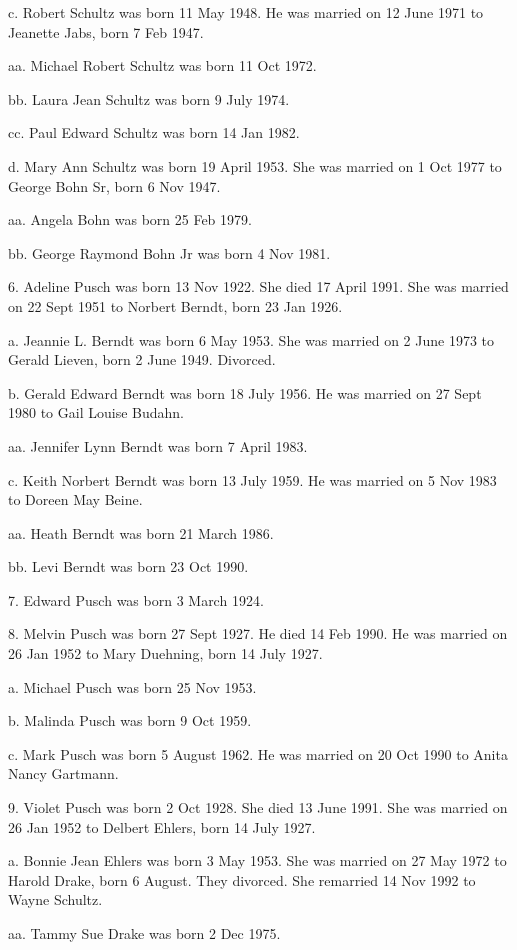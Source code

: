 \documentclass[a4paper]{article}
\begin{document}
c. Robert Schultz was born 11 May 1948.  He was married on 12 June 1971 to Jeanette Jabs, born 7 Feb 1947.  

aa. Michael Robert Schultz was born 11 Oct 1972.

bb. Laura Jean Schultz was born 9 July 1974.

cc. Paul Edward Schultz was born 14 Jan 1982.

d. Mary Ann Schultz was born 19 April 1953.  She was married on 1 Oct 1977 to George Bohn Sr, born 6 Nov 1947.

aa. Angela Bohn was born 25 Feb 1979.

bb. George Raymond Bohn Jr was born 4 Nov 1981.

6. Adeline Pusch was born 13 Nov 1922.  She died 17 April 1991.  She was married on 22 Sept 1951 to Norbert Berndt, born 23 Jan 1926.

a. Jeannie L. Berndt was born 6 May 1953.  She was married on 2 June 1973 to Gerald Lieven, born 2 June 1949.  Divorced.

b. Gerald Edward Berndt was born 18 July 1956.  He was married on 27 Sept 1980 to Gail Louise Budahn.

aa. Jennifer Lynn Berndt was born 7 April 1983.

c. Keith Norbert Berndt was born 13 July 1959.  He was married on 5 Nov 1983 to Doreen May Beine.

aa. Heath Berndt was born 21 March 1986.

bb. Levi Berndt was born 23 Oct 1990.

7. Edward Pusch was born 3 March 1924.

8. Melvin Pusch was born 27 Sept 1927.  He died 14 Feb 1990.  He was married on 26 Jan 1952 to Mary Duehning, born 14 July 1927.

a. Michael Pusch was born 25 Nov 1953.

b. Malinda Pusch was born 9 Oct 1959.

c. Mark Pusch was born 5 August 1962.  He was married on 20 Oct 1990 to Anita Nancy Gartmann.

9. Violet Pusch was born 2 Oct 1928.  She died 13 June 1991.  She was married on 26 Jan 1952 to Delbert Ehlers, born 14 July 1927.

a. Bonnie Jean Ehlers was born 3 May 1953.  She was married on 27 May 1972 to Harold Drake, born 6 August.  They divorced.  She remarried 14 Nov 1992 to Wayne Schultz.

aa. Tammy Sue Drake was born 2 Dec 1975.
\end{document}
